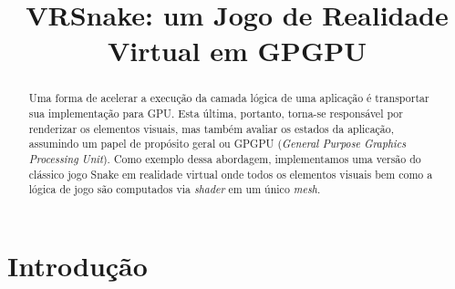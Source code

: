 \documentclass[conference]{IEEEtran}
\begin{document}
\title{VRSnake: um Jogo de Realidade Virtual em GPGPU}


\author{}



\maketitle

\begin{abstract}
Uma forma de acelerar a execução da camada lógica de uma aplicação é transportar sua implementação para GPU. Esta última, portanto, torna-se responsável por renderizar os elementos visuais, mas também avaliar os estados da aplicação, assumindo um papel de propósito geral ou GPGPU (\textit{General Purpose Graphics Processing Unit}). Como exemplo dessa abordagem, implementamos uma versão do clássico jogo Snake em realidade virtual onde todos os elementos visuais bem como a lógica de jogo são computados via \textit{shader} em um único \textit{mesh}.
\end{abstract}


\IEEEpeerreviewmaketitle

\section{Introdução} \label{sec:introduction}
\end{document}
